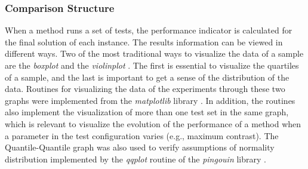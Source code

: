 			\subsubsection{Comparison Structure}\label{chap:investigation:proposal:performance:comparison}
				
				When a method runs a set of tests, the performance indicator is calculated for the final solution of each instance. The results information can be viewed in different ways. Two of the most traditional ways to visualize the data of a sample are the \textit{boxplot} and the \textit{violinplot} \citep{chen2008handbook}. The first is essential to visualize the quartiles of a sample, and the last is important to get a sense of the distribution of the data. Routines for visualizing the data of the experiments through these two graphs were implemented from the \textit{matplotlib} library \citep{hunter2007matplotlib}. In addition, the routines also implement the visualization of more than one test set in the same graph, which is relevant to visualize the evolution of the performance of a method when a parameter in the test configuration varies (e.g., maximum contrast). The Quantile-Quantile graph was also used to verify assumptions of normality distribution implemented by the \textit{qqplot} routine of the \textit{pingouin} library \citep{vallat2018pingouin}.
				
